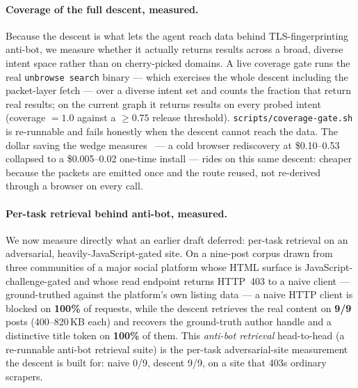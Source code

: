 \documentclass[11pt]{article}
\begin{document}
\paragraph{Coverage of the full descent, measured.} Because the descent is what lets
the agent reach data behind TLS-fingerprinting anti-bot, we measure whether it
actually returns results across a broad, diverse intent space rather than on
cherry-picked domains. A live coverage gate runs the real \texttt{unbrowse search}
binary --- which exercises the whole descent including the packet-layer fetch ---
over a diverse intent set and counts the fraction that return real results; on the
current graph it returns results on every probed intent (coverage $=1.0$ against a
$\geq 0.75$ release threshold). \texttt{scripts/coverage-gate.sh} is
re-runnable and fails honestly when the descent cannot reach the data. The dollar
saving the wedge measures~\cite{wedge} --- a cold browser rediscovery at
\$0.10--0.53 collapsed to a \$0.005--0.02 one-time install --- rides on this same
descent: cheaper because the packets are emitted once and the route reused, not
re-derived through a browser on every call.

\paragraph{Per-task retrieval behind anti-bot, measured.} We now measure directly
what an earlier draft deferred: per-task retrieval on an adversarial,
heavily-JavaScript-gated site. On a nine-post corpus drawn from three communities of
a major social platform whose HTML surface is JavaScript-challenge-gated and whose
read endpoint returns HTTP~403 to a naive client --- ground-truthed against the
platform's own listing data --- a naive HTTP client is blocked on \textbf{100\%} of
requests, while the descent retrieves the real content on \textbf{9/9} posts
(400--820\,KB each) and recovers the ground-truth author handle and a distinctive
title token on \textbf{100\%} of them. This \emph{anti-bot retrieval} head-to-head
(a re-runnable anti-bot retrieval suite) is the per-task adversarial-site measurement the
descent is built for: naive 0/9, descent 9/9, on a site that 403s ordinary scrapers.
\end{document}

